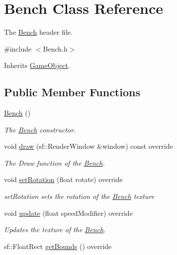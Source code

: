 \hypertarget{class_bench}{\section{Bench Class Reference}
\label{class_bench}
}


The \hyperlink{class_bench}{Bench} header file.  




{\ttfamily \#include $<$Bench.\+h$>$}



Inherits \hyperlink{class_game_object}{Game\+Object}.

\subsection*{Public Member Functions}
\begin{DoxyCompactItemize}
\item 
\hyperlink{class_bench_adb6c5dc00554246d493f9acbef4eaf51}{Bench} ()
\begin{DoxyCompactList}\small\item\em The \hyperlink{class_bench}{Bench} constructor. \end{DoxyCompactList}\item 
void \hyperlink{class_bench_a40fc8955782e814153234daa67bc4dd5}{draw} (sf\+::\+Render\+Window \&window) const override
\begin{DoxyCompactList}\small\item\em The Draw function of the \hyperlink{class_bench}{Bench}. \end{DoxyCompactList}\item 
void \hyperlink{class_bench_a8a9e65dde803b5f510fa533724eace75}{set\+Rotation} (float rotate) override
\begin{DoxyCompactList}\small\item\em set\+Rotation sets the rotation of the \hyperlink{class_bench}{Bench} texture \end{DoxyCompactList}\item 
void \hyperlink{class_bench_abb815aa9afeee6e72fa93db3d51cf1a1}{update} (float speed\+Modifier) override
\begin{DoxyCompactList}\small\item\em Updates the texture of the \hyperlink{class_bench}{Bench}. \end{DoxyCompactList}\item 
sf\+::\+Float\+Rect \hyperlink{class_bench_a9483349535b2a8333052993c3a7e02c9}{get\+Bounds} () override

\end{DoxyCompactItemize}
